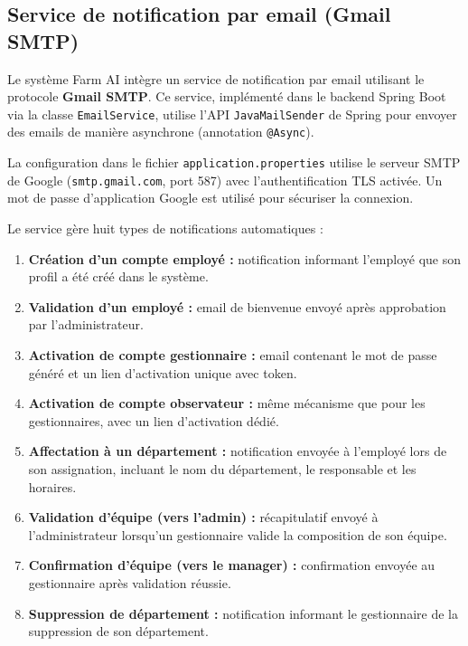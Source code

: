\subsection{Service de notification par email (Gmail SMTP)}

Le système Farm AI intègre un service de notification par email utilisant le protocole
\textbf{Gmail SMTP}. Ce service, implémenté dans le backend Spring Boot via la classe
\texttt{EmailService}, utilise l'API \texttt{JavaMailSender} de Spring pour envoyer des
emails de manière asynchrone (annotation \texttt{@Async}).

La configuration dans le fichier \texttt{application.properties} utilise le serveur
SMTP de Google (\texttt{smtp.gmail.com}, port 587) avec l'authentification TLS activée.
Un mot de passe d'application Google est utilisé pour sécuriser la connexion.

Le service gère huit types de notifications automatiques :

\begin{enumerate}
  \item \textbf{Création d'un compte employé :} notification informant l'employé que son
    profil a été créé dans le système.
  \item \textbf{Validation d'un employé :} email de bienvenue envoyé après approbation par
    l'administrateur.
  \item \textbf{Activation de compte gestionnaire :} email contenant le mot de passe
    généré et un lien d'activation unique avec token.
  \item \textbf{Activation de compte observateur :} même mécanisme que pour les gestionnaires,
    avec un lien d'activation dédié.
  \item \textbf{Affectation à un département :} notification envoyée à l'employé lors de
    son assignation, incluant le nom du département, le responsable et les horaires.
  \item \textbf{Validation d'équipe (vers l'admin) :} récapitulatif envoyé à l'administrateur
    lorsqu'un gestionnaire valide la composition de son équipe.
  \item \textbf{Confirmation d'équipe (vers le manager) :} confirmation envoyée au
    gestionnaire après validation réussie.
  \item \textbf{Suppression de département :} notification informant le gestionnaire
    de la suppression de son département.
\end{enumerate}


